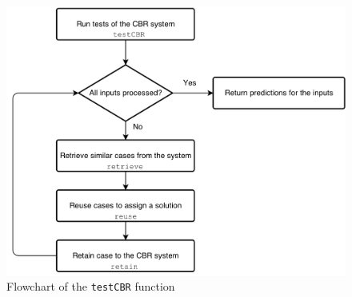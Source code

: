 \documentclass[a4paper]{article}
\begin{document}
\begin{figure}[H]
\center
\includegraphics[width=0.9\columnwidth]{testCBR}
\caption{Flowchart of the \texttt{testCBR} function}
\label{flowchartTestCBR}
\end{figure}

\clearpage

\end{document}
